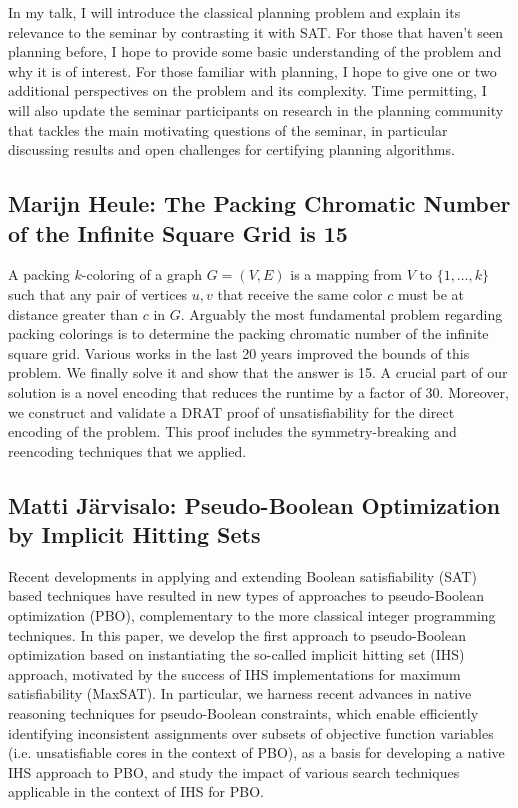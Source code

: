 \documentclass[11pt]{article}
\begin{document}
In my talk, I will introduce the classical planning problem and explain its relevance to the seminar by contrasting it with SAT. For those that haven't seen planning before, I hope to provide some basic understanding of the problem and why it is of interest. For those familiar with planning, I hope to give one or two additional perspectives on the problem and its complexity. Time permitting, I will also update the seminar participants on research in the planning community that tackles the main motivating questions of the seminar, in particular discussing results and open challenges for certifying planning algorithms.


\subsection*{Marijn Heule: The Packing Chromatic Number of the Infinite Square Grid is 15}\label{Heule}

A packing $k$-coloring of a graph $G = (V, E)$ is a mapping from $V$ to $\{1, \ldots, k\}$ such that any pair of vertices $u, v$ that receive the same color $c$ must be at distance greater than $c$ in $G$. Arguably the most fundamental problem regarding packing colorings is to determine the packing chromatic number of the infinite square grid. Various works in the last 20 years improved the bounds of this problem. We finally solve it and show that the answer is 15. A crucial part of our solution is a novel encoding that reduces the runtime by a factor of 30. Moreover, we construct and validate a DRAT proof of unsatisfiability for the direct encoding of the problem. This proof includes the symmetry-breaking and reencoding techniques that we applied.


\subsection*{Matti Järvisalo: Pseudo-Boolean Optimization by Implicit Hitting Sets}\label{Jarvisalo}

Recent developments in applying and extending Boolean satisfiability (SAT) based techniques have resulted in new types of approaches to pseudo-Boolean optimization (PBO), complementary to the more classical integer programming techniques. In this paper, we develop the first approach to pseudo-Boolean optimization based on instantiating the so-called implicit hitting set (IHS) approach, motivated by the success of IHS implementations for maximum satisfiability (MaxSAT). In particular, we harness recent advances in native reasoning techniques for pseudo-Boolean constraints, which enable efficiently identifying inconsistent assignments over subsets of objective function variables (i.e. unsatisfiable cores in the context of PBO), as a basis for developing a native IHS approach to PBO, and study the impact of various search techniques applicable in the context of IHS for PBO.
\end{document}
